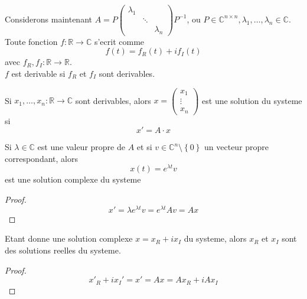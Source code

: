 \documentclass[../main.tex]{subfiles}
\begin{document}
Considerons maintenant $A = P \begin{pmatrix}
	\lambda_1 & & \\
		  & \ddots & \\
		  & & \lambda_n
\end{pmatrix} P^{-1}$, ou $P \in \mathbb{C}^{n\times n}, \lambda_1, \ldots, \lambda_n \in \mathbb{C}$.\\
Toute fonction $f: \mathbb{R}\to \mathbb{C}$ s'ecrit comme
\[ 
	f( t) = f_R( t)  + i f_I( t) 
\]
avec $f_R, f_I : \mathbb{R} \to \mathbb{R}$.\\
$f$ est derivable si $f_R$ et $f_I$ sont derivables.\\
\begin{rmq}
Si $x_1, \ldots, x_n: \mathbb{R}\to \mathbb{C}$ sont derivables, alors $x= \begin{pmatrix}
x_1\\\vdots\\x_n
\end{pmatrix} $ est une solution du systeme si
\[ 
x' = A \cdot x
\]

\end{rmq}
\begin{lemma}
Si $\lambda \in \mathbb{C}$ est une valeur propre de $A$ et si $v \in \mathbb{C}^{n}\setminus \left\{ 0 \right\} $ un vecteur propre correspondant, alors
\[ 
	x( t) = e^{\lambda t}  v
\]
est une solution complexe du systeme

\end{lemma}
\begin{proof}
\[ 
x' = \lambda e^{\lambda t}  v = e^{\lambda t}  A v= Ax
\]
\end{proof}
\begin{lemma}
Etant donne une solution complexe $x= x_R + i x_I $ du systeme, alors $x_R$ et $x_I$ sont des solutions reelles du systeme.
\end{lemma}
\begin{proof}
\[ 
	x'_R + i x_I' = x' = A x = A x_R + i A x_I
\]
\end{proof}
\end{document}

